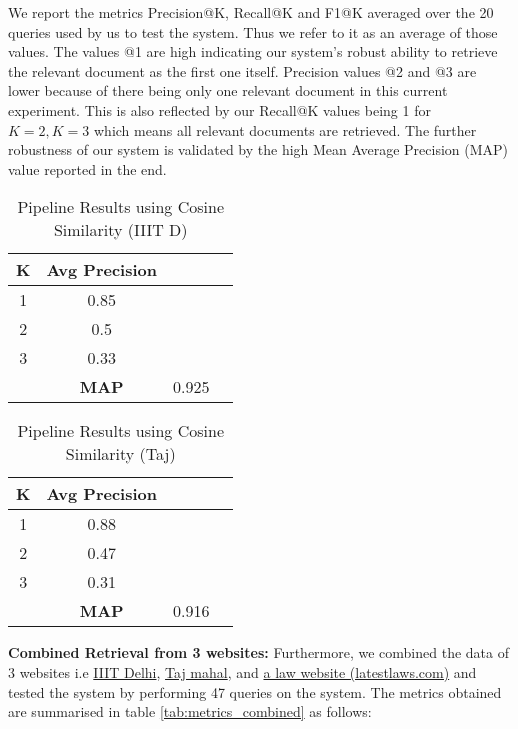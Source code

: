 \documentclass[sigconf,natbib=true,anonymous=false]{acmart}
\begin{document}
We report the metrics Precision@K, Recall@K and F1@K averaged over the 20 queries used by us to test the system. Thus we refer to it as an average of those values. The values @1 are high indicating our system's robust ability to retrieve the relevant document as the first one itself. Precision values @2 and @3 are lower because of there being only one relevant document in this current experiment. This is also reflected by our Recall@K values being 1 for $K=2, K=3$ which means all relevant documents are retrieved. The further robustness of our system is validated by the high Mean Average Precision (MAP) value reported in the end.

\begin{table}[h]
\centering
\begin{tabular}{cccc}
\hline
\textbf{K} & \textbf{Avg Precision}\\ \hline
1          & 0.85                \\
2          & 0.5                \\
3          & 0.33                     \\ 
\hline
&\textbf{MAP}        &0.925& \\
\hline
\end{tabular}
\caption{Pipeline Results using Cosine Similarity (IIIT D)}
\label{tab:metrics}
\end{table}

\begin{table}[h]
\centering
\begin{tabular}{cccc}
\hline
\textbf{K} & \textbf{Avg Precision}  \\ \hline
1          & 0.88                \\
2          & 0.47                      \\
3          & 0.31                \\ 
\hline
&\textbf{MAP}        &0.916& \\
\hline
\end{tabular}
\caption{Pipeline Results using Cosine Similarity (Taj)}
\label{tab:metrics_taj}
\end{table}

\textbf{Combined Retrieval from 3 websites:} Furthermore, we combined the data of 3 websites i.e \href{www.iiitd.ac.in}{IIIT Delhi}, \href{www.tajmahal.gov.in}{Taj mahal}, and \href{www.latestlaws.com}{a law website (latestlaws.com)} and tested the system by performing 47 queries on the system. The metrics obtained are summarised in table \ref{tab:metrics_combined} as follows: 
\end{document}
